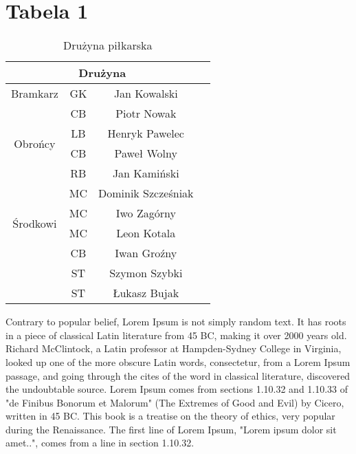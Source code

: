 \documentclass[a4paper,12pt]{article}
\begin{document}
	\section{Tabela 1}
	\begin{table}[h!]
		\centering
		\begin{tabular}{ |c|c|c|c| } 
			\hline
			\multicolumn{3}{|c|}{Drużyna} \\
			\hline
			Bramkarz & GK & Jan Kowalski \\
			\hline
			\multirow{4}{4em}{Obrońcy} & CB & Piotr Nowak \\ 
			& LB & Henryk Pawelec \\ 
			& CB & Paweł Wolny \\ 
			& RB & Jan Kamiński \\ 
			\hline
			\multirow{4}{4em}{Środkowi} & MC  & Dominik Szcześniak \\ 
			& MC & Iwo Zagórny \\ 
			& MC & Leon Kotala \\
			\hline	
			\multirow{4}{5em}{Napastnicy} & CB & Iwan Groźny \\ 
			& ST & Szymon Szybki \\ 
			& ST & Łukasz Bujak \\ 
			\hline	
		\end{tabular}
		\caption{Drużyna piłkarska}
	\end{table}
	Contrary to popular belief, Lorem Ipsum is not simply random text. It has roots in a piece of classical Latin literature from 45 BC, making it over 2000 years old. Richard McClintock, a Latin professor at Hampden-Sydney College in Virginia, looked up one of the more obscure Latin words, consectetur, from a Lorem Ipsum passage, and going through the cites of the word in classical literature, discovered the undoubtable source. Lorem Ipsum comes from sections 1.10.32 and 1.10.33 of "de Finibus Bonorum et Malorum" (The Extremes of Good and Evil) by Cicero, written in 45 BC. This book is a treatise on the theory of ethics, very popular during the Renaissance. The first line of Lorem Ipsum, "Lorem ipsum dolor sit amet..", comes from a line in section 1.10.32.
	
\end{document}
